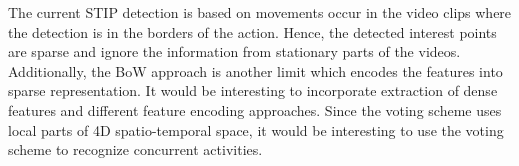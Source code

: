 \documentclass[a4paper, 10pt, conference]{ieeeconf}      %
\begin{document}

    The current STIP detection is based on movements occur in the video clips where the detection is in the borders of the action. Hence, the detected interest points are sparse and ignore the information from stationary parts of the videos. Additionally, the BoW approach is another limit which encodes the features into sparse representation. It would be interesting to incorporate extraction of dense features and different feature encoding approaches. Since the voting scheme uses local parts of 4D spatio-temporal space, it would be interesting to use the voting scheme to recognize concurrent activities.









\end{document}
